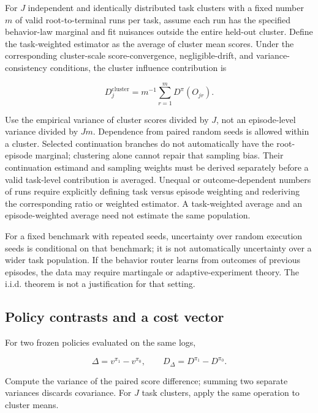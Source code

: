 For \(J\) independent and identically distributed task clusters with a fixed number \(m\) of valid root-to-terminal runs per task, assume each run has the specified behavior-law marginal and fit nuisances outside the entire held-out cluster. Define the task-weighted estimator as the average of cluster mean scores. Under the corresponding cluster-scale score-convergence, negligible-drift, and variance-consistency conditions, the cluster influence contribution is

\begin{equation}\label{eq:core13}
D_j^{\mathrm{cluster}}=m^{-1}\sum_{r=1}^{m}D^{\pi}(O_{jr}).
\end{equation}

Use the empirical variance of cluster scores divided by \(J\), not an episode-level variance divided by \(Jm\). Dependence from paired random seeds is allowed within a cluster. Selected continuation branches do not automatically have the root-episode marginal; clustering alone cannot repair that sampling bias. Their continuation estimand and sampling weights must be derived separately before a valid task-level contribution is averaged. Unequal or outcome-dependent numbers of runs require explicitly defining task versus episode weighting and rederiving the corresponding ratio or weighted estimator. A task-weighted average and an episode-weighted average need not estimate the same population.

For a fixed benchmark with repeated seeds, uncertainty over random execution seeds is conditional on that benchmark; it is not automatically uncertainty over a wider task population. If the behavior router learns from outcomes of previous episodes, the data may require martingale or adaptive-experiment theory. The i.i.d. theorem is not a justification for that setting.

\subsection{Policy contrasts and a cost vector}\label{policy-contrasts-and-a-cost-vector}

For two frozen policies evaluated on the same logs,

\begin{equation}\label{eq:core14}
\Delta=v^{\pi_1}-v^{\pi_0},\qquad
D_\Delta=D^{\pi_1}-D^{\pi_0}.
\end{equation}

Compute the variance of the paired score difference; summing two separate variances discards covariance. For \(J\) task clusters, apply the same operation to cluster means.

